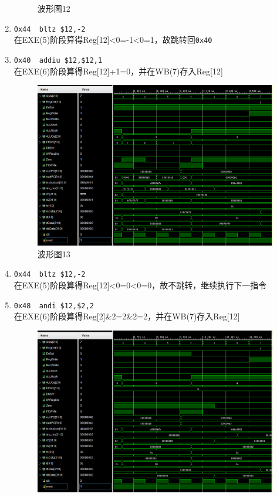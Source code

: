 \begin{enumerate}
\begin{figure}[H]
\caption{波形图12}
\label{fig:wave_12}
\end{figure}
    \item \verb'0x44  bltz $12,-2'\\
    在EXE(5)阶段算得Reg[12]<0=-1<0=1，故跳转回\verb'0x40'
    \item \verb'0x40  addiu $12,$12,1'\\
    在EXE(6)阶段算得Reg[12]+1=0，并在WB(7)存入Reg[12]
\begin{figure}[H]
\centering
\includegraphics[width=0.9\linewidth]{fig/FullIns/Ins13.PNG}
\caption{波形图13}
\label{fig:wave_13}
\end{figure}
    \item \verb'0x44  bltz $12,-2'\\
    在EXE(5)阶段算得Reg[12]<0=0<0=0，故不跳转，继续执行下一指令
    \item \verb'0x48  andi $12,$2,2'\\
    在EXE(6)阶段算得Reg[2]\&2=2\&2=2，并在WB(7)存入Reg[12]
\begin{figure}[H]
\centering
\includegraphics[width=0.9\linewidth]{fig/FullIns/Ins14.PNG}

\end{figure}
\end{enumerate}
